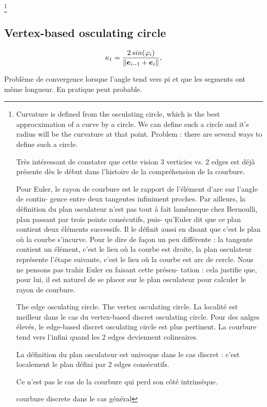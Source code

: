 \footnote{
Curvature is defined from the osculating circle, which is the best approcximation of a curve by a circle.
We can define such a circle and it's radius will be the curvature at that point. Problem : there are several ways to define such a circle.

Très intéressant de constater que cette vision 3 verticies  vs. 2 edges est déjà présente dès le début dans l'histoire de la compréhension de la courbure.

Pour Euler, le rayon de courbure est le rapport de l’élément d’arc sur l’angle de contin-
gence entre deux tangentes infiniment proches. Par ailleurs, la définition du plan osculateur n’est pas tout à fait lamêmeque chez Bernoulli, plan passant par trois points consécutifs, puis- qu’Euler dit que ce plan contient deux éléments successifs. Il le définit aussi en disant que c’est le plan où la courbe s’incurve. Pour le dire de façon un peu différente : la tangente contient un élément, c’est le lieu où la courbe est droite, la plan osculateur représente l’étape suivante, c’est le lieu où la courbe est arc de cercle. Nous ne pensons pas trahir Euler en faisant cette présen- tation : cela justifie que, pour lui, il est naturel de se placer sur le plan osculateur pour calculer le rayon de courbure. \cite{Delcourt2007}


The edge osculating circle.
The vertex osculating circle.
La localité est meilleur dans le cas du vertex-based discret osculating circle.
Pour des anlges élevés, le edge-based discret osculating circle est plus pertinent.
La courbure tend vers l'infini quand les 2 edges deviennent colineaires.

La définition du plan osculateur est univoque dans le cas discret : c'est localement le plan défini par 2 edges consécutifs.

Ce n'est pas le cas de la courbure qui perd son côté intrinsèque.

courbure discrete dans le cas général
}

\subsection{Vertex-based osculating circle}

\begin{equation}
	\kappa_1 = \frac{2 \,sin(\varphi_i)}{\lVert\boldsymbol{e}_{i-1} + \boldsymbol{e}_{i}\rVert},
\end{equation}

Problème de convergence lorsque l'angle tend vers pi et que les segments ont même longueur.
En pratique peut probable.

